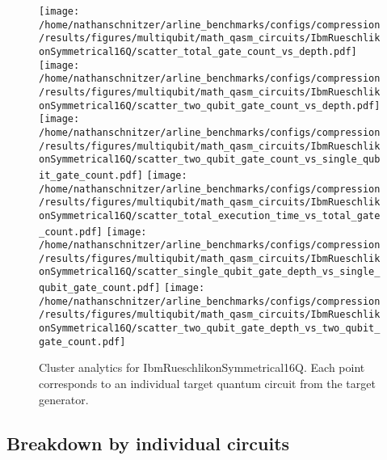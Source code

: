 \documentclass{report}%
\begin{document}
\begin{figure}[h!]%
\centering%
\texttt{[image: /home/nathanschnitzer/arline\_benchmarks/configs/compression/results/figures/multiqubit/math\_qasm\_circuits/IbmRueschlikonSymmetrical16Q/scatter\_total\_gate\_count\_vs\_depth.pdf]}%
\centering%
\texttt{[image: /home/nathanschnitzer/arline\_benchmarks/configs/compression/results/figures/multiqubit/math\_qasm\_circuits/IbmRueschlikonSymmetrical16Q/scatter\_two\_qubit\_gate\_count\_vs\_depth.pdf]}%
\linebreak%
\centering%
\texttt{[image: /home/nathanschnitzer/arline\_benchmarks/configs/compression/results/figures/multiqubit/math\_qasm\_circuits/IbmRueschlikonSymmetrical16Q/scatter\_two\_qubit\_gate\_count\_vs\_single\_qubit\_gate\_count.pdf]}%
\centering%
\texttt{[image: /home/nathanschnitzer/arline\_benchmarks/configs/compression/results/figures/multiqubit/math\_qasm\_circuits/IbmRueschlikonSymmetrical16Q/scatter\_total\_execution\_time\_vs\_total\_gate\_count.pdf]}%
\linebreak%
\centering%
\texttt{[image: /home/nathanschnitzer/arline\_benchmarks/configs/compression/results/figures/multiqubit/math\_qasm\_circuits/IbmRueschlikonSymmetrical16Q/scatter\_single\_qubit\_gate\_depth\_vs\_single\_qubit\_gate\_count.pdf]}%
\centering%
\texttt{[image: /home/nathanschnitzer/arline\_benchmarks/configs/compression/results/figures/multiqubit/math\_qasm\_circuits/IbmRueschlikonSymmetrical16Q/scatter\_two\_qubit\_gate\_depth\_vs\_two\_qubit\_gate\_count.pdf]}%
\linebreak%
\caption{Cluster analytics for IbmRueschlikonSymmetrical16Q. Each point corresponds to an individual target
                    quantum circuit from the target generator.}%
\end{figure}

%
\clearpage%
\subsection*{Breakdown by individual circuits }%
\label{subsec:Breakdownbyindividualcircuits}%

%
\end{document}
